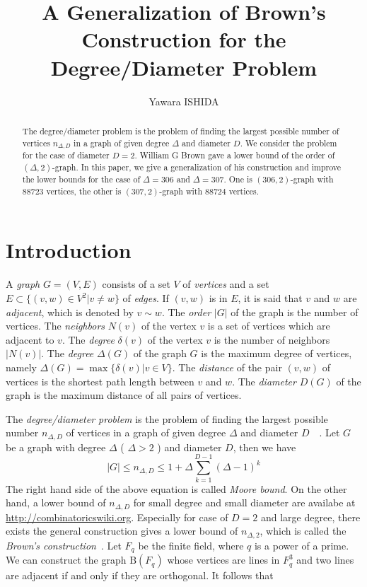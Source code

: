 \documentclass{article}
\title{A Generalization of Brown's Construction for the Degree/Diameter Problem}
\author{Yawara ISHIDA}
\newcommand{\B}{\mathrm{B}}
\begin{document}
\maketitle
\begin{abstract}
The degree/diameter problem is the problem of finding the largest possible number of vertices $n_{\Delta,D}$ in a graph of given degree $\Delta$ and diameter $D$.
We consider the problem for the case of diameter $D=2$.
William G Brown gave a lower bound of the order of $(\Delta,2)$-graph.
In this paper, we give a generalization of his construction and improve the lower bounds for the case of $\Delta=306$ and $\Delta=307$.
One is $(306,2)$-graph with $88723$ vertices, the other is $(307,2)$-graph with $88724$ vertices.
\end{abstract}

\section{Introduction}
A {\it graph} $G=(V,E)$ consists of a set $V$ of {\it vertices} and a set $E \subset \{(v,w) \in V^2 | v \neq w \}$ of {\it edges}.
If $(v,w)$ is in $E$, it is said that $v$ and $w$ are {\it adjacent}, which is denoted by $v \sim w$.
The {\it order} $|G|$ of the graph is the number of vertices. 
The {\it neighbors} $N(v)$ of the vertex $v$ is a set of vertices which are adjacent to $v$.
The {\it degree} $\delta(v)$ of the vertex $v$ is the number of neighbors $| N(v) |$.  
The {\it degree} $\Delta(G)$ of the graph $G$ is the maximum degree of vertices, namely $\Delta(G)=\max\{\delta(v)|v\in V\}$.
The {\it distance} of the pair $(v,w)$ of vertices is the shortest path length between $v$ and $w$. 
The {\it diameter} $D(G)$ of the graph is the  maximum distance of all pairs of vertices.

The {\it degree/diameter problem} is the problem of finding the largest possible number  $n_{\Delta,D}$ of vertices in a graph of given degree $\Delta$ and diameter $D$~\cite{MilSir2005}~\cite{brown1966graphs}. 
Let $G$ be a graph with degree $\Delta$ ( $\Delta > 2$ ) and diameter $D$, then we have 
\[ |G| \leq n_{\Delta,D} \leq 1 + \Delta \sum_{k=1}^{D-1} (\Delta - 1)^k\]
The right hand side of the above equation is called {\it Moore bound}.
On the other hand, a lower bound of $n_{\Delta,D}$ for small degree and small diameter are availabe at \url{http://combinatoricswiki.org}. 
Especially for case of $D=2$ and large degree, there exists the general construction gives a lower bound of $n_{\Delta,2}$, which is called the {\it Brown's construction}~\cite{MilSir2005}.
Let $F_q$ be the finite field, where $q$ is a power of a prime.
We can construct the graph $\B(F_q)$ whose vertices are lines in $F_q^3$ and two lines are adjacent if and only if they are orthogonal. 
It follows that
\end{document}
